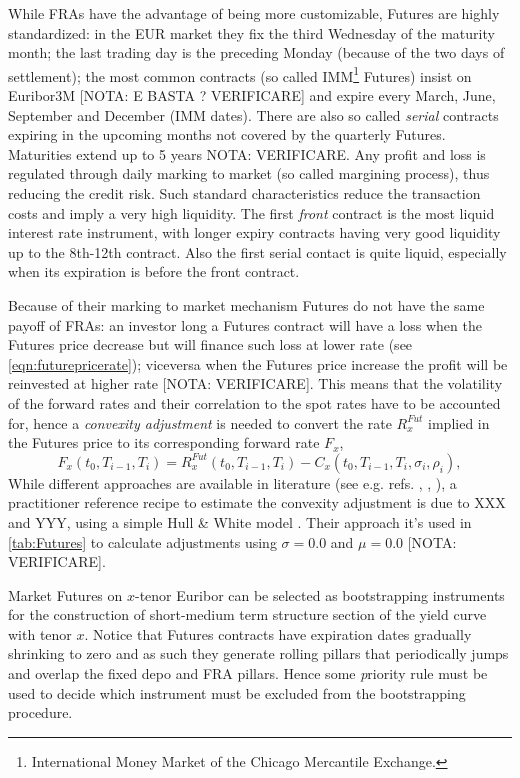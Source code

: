\documentclass[11pt,reqno]{amsart}
\begin{document}
While FRAs have the advantage of being more customizable, Futures are highly standardized: in the EUR market they fix the third Wednesday of the maturity month; the last trading day is the preceding Monday (because of the two days of settlement); the most common contracts (so called IMM\footnote{International Money Market of the Chicago Mercantile Exchange.} Futures) insist on Euribor3M [NOTA: E BASTA ? VERIFICARE] and expire every March, June, September and December (IMM dates). There are also so called {\it serial} contracts expiring in the upcoming months not covered by the quarterly Futures. Maturities extend up to 5 years {NOTA: VERIFICARE}. Any profit and loss is regulated through daily marking to market (so called margining process), thus reducing the credit risk.
Such standard characteristics reduce the transaction costs and imply a very high liquidity. The first {\it front} contract is the most liquid interest rate instrument, with longer expiry contracts having very good liquidity up to the 8th-12th contract. Also the first serial contact is quite liquid, especially when its expiration is before the front contract.
\par
Because of their marking to market mechanism Futures do not have the same payoff of FRAs: an investor long a Futures contract will have a loss when the Futures price decrease but will finance such loss at lower rate (see \ref{eqn:futurepricerate}); viceversa when the Futures price increase the profit will be reinvested at higher rate [NOTA: VERIFICARE]. This means that the volatility of the forward rates and their correlation to the spot rates have to be accounted for, hence a {\it convexity adjustment} is needed to convert the rate $R^{Fut}_x$ implied in the Futures price to its corresponding forward rate $F_x$,
\begin{equation}
F_x\left(t_0,T_{i-1},T_i\right) = R^{Fut}_x\left(t_0,T_{i-1},T_i\right)-C_x\left(t_0,T_{i-1},T_i,\sigma_i,\rho_i\right),
\label{eqn:fwdfromfutureprice}
\end{equation}
While different approaches are available in literature (see e.g. refs. \cite{Jac05}, \cite{PitRen06}, \cite{Vaillant}), a practitioner reference recipe to estimate the convexity adjustment is due to  XXX and YYY, using a simple Hull \& White model \cite{HulWhi1990}. Their approach it's used in \ref{tab:Futures} to calculate adjustments using
$\sigma = 0.0$ and $\mu = 0.0$ [NOTA: VERIFICARE].
\par
Market Futures on $x$-tenor Euribor can be selected as bootstrapping instruments for the construction of short-medium term structure section of the yield curve with tenor $x$.
Notice that Futures contracts have expiration dates gradually shrinking to zero and as such they generate rolling pillars that periodically jumps and overlap the fixed depo and FRA pillars. Hence some {\emph priority} rule must be used to decide which instrument must be excluded from the bootstrapping procedure.
\end{document}
